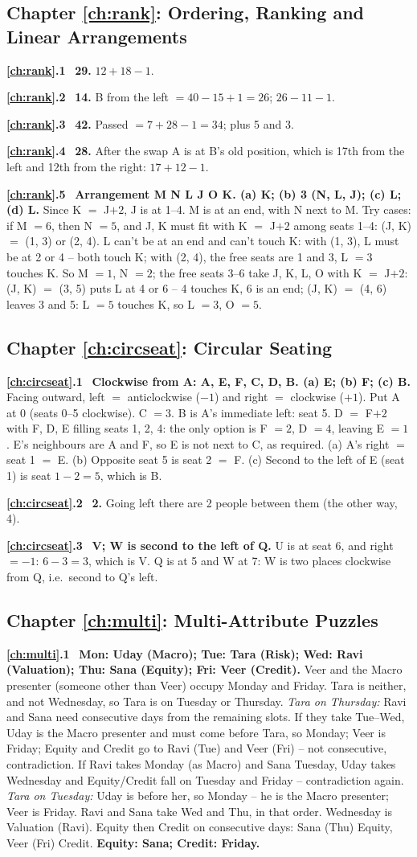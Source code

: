 \documentclass[11pt,a4paper,openany]{report}
\newcommand{\solchapter}[2]{\subsection*{Chapter \ref*{#1}: #2}\def\solprefix{\ref*{#1}}}
\newcommand{\sol}[1]{\par\smallskip\textbf{\solprefix.#1}\ }
\begin{document}
\solchapter{ch:rank}{Ordering, Ranking and Linear Arrangements}
\sol{1} \textbf{29.} $12+18-1$.
\sol{2} \textbf{14.} B from the left $=40-15+1=26$; $26-11-1$.
\sol{3} \textbf{42.} Passed $=7+28-1=34$; plus 5 and 3.
\sol{4} \textbf{28.} After the swap A is at B's old position, which is 17th from the left and 12th from the right: $17+12-1$.
\sol{5} \textbf{Arrangement M N L J O K. (a) K; (b) 3 (N, L, J); (c) L; (d) L.}
Since K $=$ J$+2$, J is at 1--4. M is at an end, with N next to M. Try cases: if M $=6$, then N $=5$, and J, K must fit with K $=$ J$+2$ among seats 1--4: (J, K) $=$ (1, 3) or (2, 4). L can't be at an end and can't touch K: with (1, 3), L must be at 2 or 4 -- both touch K; with (2, 4), the free seats are 1 and 3, L $=3$ touches K. So M $=1$, N $=2$; the free seats 3--6 take J, K, L, O with K $=$ J$+2$: (J, K) $=$ (3, 5) puts L at 4 or 6 -- 4 touches K, 6 is an end; (J, K) $=$ (4, 6) leaves 3 and 5: L $=5$ touches K, so L $=3$, O $=5$.

\solchapter{ch:circseat}{Circular Seating}
\sol{1} \textbf{Clockwise from A: A, E, F, C, D, B. (a) E; (b) F; (c) B.}
Facing outward, left $=$ anticlockwise ($-1$) and right $=$ clockwise ($+1$). Put A at 0 (seats 0--5 clockwise). C $=3$. B is A's immediate left: seat 5. D $=$ F$+2$ with F, D, E filling seats 1, 2, 4: the only option is F $=2$, D $=4$, leaving E $=1$. E's neighbours are A and F, so E is not next to C, as required.
(a) A's right $=$ seat 1 $=$ E. (b) Opposite seat 5 is seat 2 $=$ F. (c) Second to the left of E (seat 1) is seat $1-2=5$, which is B.

\sol{2} \textbf{2.} Going left there are 2 people between them (the other way, 4).

\sol{3} \textbf{V; W is second to the left of Q.} U is at seat 6, and right $=-1$: $6-3=3$, which is V. Q is at 5 and W at 7: W is two places clockwise from Q, i.e.\ second to Q's left.

\solchapter{ch:multi}{Multi-Attribute Puzzles}
\sol{1} \textbf{Mon: Uday (Macro); Tue: Tara (Risk); Wed: Ravi (Valuation); Thu: Sana (Equity); Fri: Veer (Credit).}
Veer and the Macro presenter (someone other than Veer) occupy Monday and Friday. Tara is neither, and not Wednesday, so Tara is on Tuesday or Thursday.
\emph{Tara on Thursday:} Ravi and Sana need consecutive days from the remaining slots. If they take Tue--Wed, Uday is the Macro presenter and must come before Tara, so Monday; Veer is Friday; Equity and Credit go to Ravi (Tue) and Veer (Fri) -- not consecutive, contradiction. If Ravi takes Monday (as Macro) and Sana Tuesday, Uday takes Wednesday and Equity/Credit fall on Tuesday and Friday -- contradiction again.
\emph{Tara on Tuesday:} Uday is before her, so Monday -- he is the Macro presenter; Veer is Friday. Ravi and Sana take Wed and Thu, in that order. Wednesday is Valuation (Ravi). Equity then Credit on consecutive days: Sana (Thu) Equity, Veer (Fri) Credit.
\textbf{Equity: Sana; Credit: Friday.}
\end{document}
